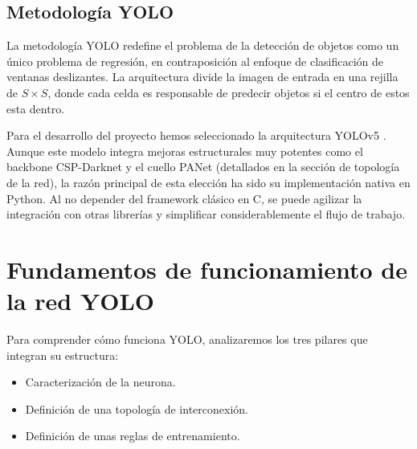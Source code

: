 \documentclass{article}
\begin{document}
	\subsection{Metodología YOLO}
	La metodología YOLO  redefine el problema de la detección de objetos como un único problema de regresión, en contraposición al enfoque de clasificación de ventanas deslizantes. La arquitectura divide la imagen de entrada en una rejilla de $S \times S$, donde cada celda es responsable de predecir objetos si el centro de estos esta dentro.
	
	
	Para el desarrollo del proyecto hemos seleccionado la arquitectura YOLOv5 \cite{yolov5}. Aunque este modelo integra mejoras estructurales muy potentes como el backbone CSP-Darknet y el cuello PANet (detallados en la sección de topología de la red), la razón principal de esta elección ha sido su implementación nativa en Python. Al no depender del framework clásico en C, se puede agilizar la integración con otras librerías y simplificar considerablemente el flujo de trabajo.
	\section{Fundamentos de funcionamiento de la red YOLO}
	Para comprender cómo funciona YOLO, analizaremos los tres pilares que integran su estructura:
	
	\begin{itemize}
		\item Caracterización de la neurona.
		\item Definición de una topología de interconexión.
		\item Definición de unas reglas de entrenamiento.
	\end{itemize}
	
\end{document}
